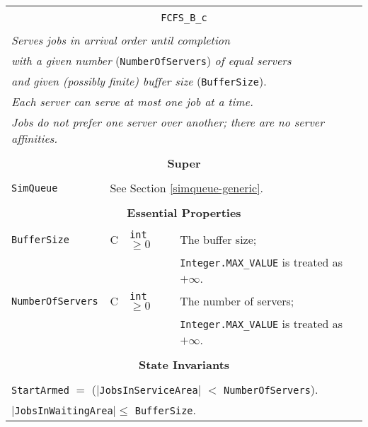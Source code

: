 \documentclass[12pt]{book}
\begin{document}
\begin{tabular}{|l|l|l|l|}
\hline
\multicolumn{4}{|c|}{} \\
\multicolumn{4}{|c|}{\lstinline[basicstyle=\large]{FCFS_B_c}} \\
\multicolumn{4}{|c|}{} \\
\hline
\multicolumn{4}{|l|}{\em Serves jobs in arrival order until completion\/} \\
\multicolumn{4}{|l|}{{\em with a given number\/} (\lstinline|NumberOfServers|) {\em of equal servers}} \\
\multicolumn{4}{|l|}{{\em and given (possibly finite) buffer size\/} (\lstinline|BufferSize|).} \\
\multicolumn{4}{|l|}{\em Each server can serve at most one job at a time.} \\
\multicolumn{4}{|l|}{\em Jobs do not prefer one server over another; there are no server affinities.} \\
\hline
\multicolumn{4}{|c|}{} \\
\multicolumn{4}{|c|}{\bf Super} \\
\multicolumn{4}{|c|}{} \\
\hline
\lstinline|SimQueue| & \multicolumn{3}{|l|}{See Section \ref{simqueue-generic}.} \\
\hline
\multicolumn{4}{|c|}{} \\
\multicolumn{4}{|c|}{\bf Essential Properties} \\
\multicolumn{4}{|c|}{} \\
\hline
\lstinline|BufferSize|      & C & \lstinline|int| $\geq 0$
                            & The buffer size; \\
                        & & & \lstinline|Integer.MAX_VALUE| is treated as $+\infty$. \\
\hline
\lstinline|NumberOfServers| & C & \lstinline|int| $\geq 0$
                            & The number of servers; \\
                        & & & \lstinline|Integer.MAX_VALUE| is treated as $+\infty$. \\
\hline
\multicolumn{4}{|c|}{} \\
\multicolumn{4}{|c|}{\bf State  Invariants} \\
\multicolumn{4}{|c|}{} \\
\hline
\multicolumn{4}{|l|}{\lstinline|StartArmed| $=$ ($|$\lstinline|JobsInServiceArea|$|$ $<$ \lstinline|NumberOfServers|).} \\
\multicolumn{4}{|l|}{$|$\lstinline|JobsInWaitingArea|$| \leq$ \lstinline|BufferSize|.} \\

\end{tabular}
\end{document}
